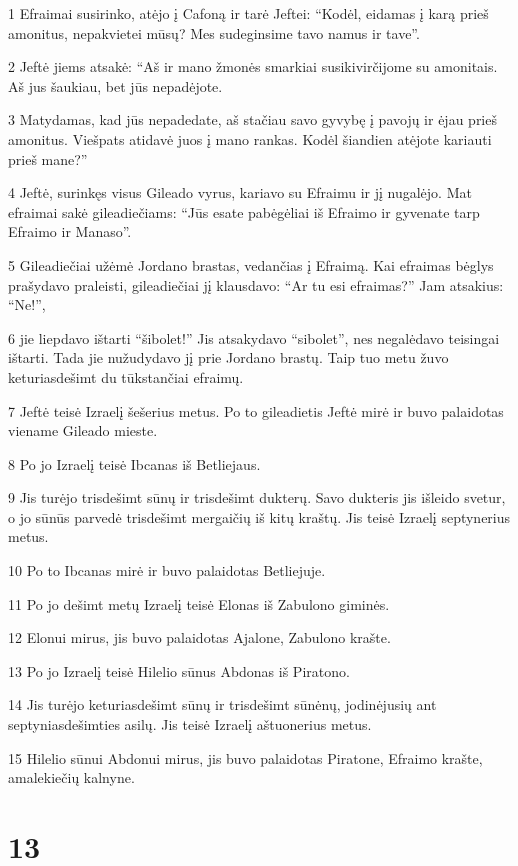 \par 1 Efraimai susirinko, atėjo į Cafoną ir tarė Jeftei: “Kodėl, eidamas į karą prieš amonitus, nepakvietei mūsų? Mes sudeginsime tavo namus ir tave”. 
\par 2 Jeftė jiems atsakė: “Aš ir mano žmonės smarkiai susikivirčijome su amonitais. Aš jus šaukiau, bet jūs nepadėjote. 
\par 3 Matydamas, kad jūs nepadedate, aš stačiau savo gyvybę į pavojų ir ėjau prieš amonitus. Viešpats atidavė juos į mano rankas. Kodėl šiandien atėjote kariauti prieš mane?” 
\par 4 Jeftė, surinkęs visus Gileado vyrus, kariavo su Efraimu ir jį nugalėjo. Mat efraimai sakė gileadiečiams: “Jūs esate pabėgėliai iš Efraimo ir gyvenate tarp Efraimo ir Manaso”. 
\par 5 Gileadiečiai užėmė Jordano brastas, vedančias į Efraimą. Kai efraimas bėglys prašydavo praleisti, gileadiečiai jį klausdavo: “Ar tu esi efraimas?” Jam atsakius: “Ne!”, 
\par 6 jie liepdavo ištarti “šibolet!” Jis atsakydavo “sibolet”, nes negalėdavo teisingai ištarti. Tada jie nužudydavo jį prie Jordano brastų. Taip tuo metu žuvo keturiasdešimt du tūkstančiai efraimų. 
\par 7 Jeftė teisė Izraelį šešerius metus. Po to gileadietis Jeftė mirė ir buvo palaidotas viename Gileado mieste. 
\par 8 Po jo Izraelį teisė Ibcanas iš Betliejaus. 
\par 9 Jis turėjo trisdešimt sūnų ir trisdešimt dukterų. Savo dukteris jis išleido svetur, o jo sūnūs parvedė trisdešimt mergaičių iš kitų kraštų. Jis teisė Izraelį septynerius metus. 
\par 10 Po to Ibcanas mirė ir buvo palaidotas Betliejuje. 
\par 11 Po jo dešimt metų Izraelį teisė Elonas iš Zabulono giminės. 
\par 12 Elonui mirus, jis buvo palaidotas Ajalone, Zabulono krašte. 
\par 13 Po jo Izraelį teisė Hilelio sūnus Abdonas iš Piratono. 
\par 14 Jis turėjo keturiasdešimt sūnų ir trisdešimt sūnėnų, jodinėjusių ant septyniasdešimties asilų. Jis teisė Izraelį aštuonerius metus. 
\par 15 Hilelio sūnui Abdonui mirus, jis buvo palaidotas Piratone, Efraimo krašte, amalekiečių kalnyne.



\chapter{13}

